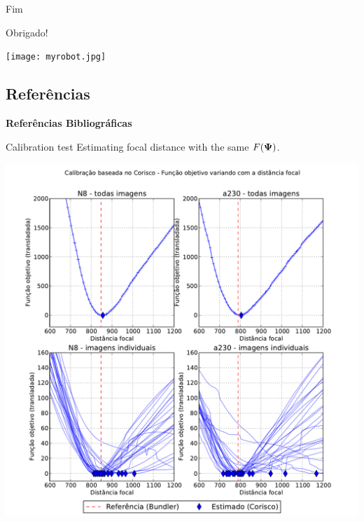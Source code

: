 \begin{frame}{Fim}
\begin{minipage}{10em}
  Obrigado!
\end{minipage}
\begin{minipage}{10em}
  \centerline{\texttt{[image: myrobot.jpg]}}
\end{minipage}

\end{frame}



\appendix
{}
\setcounter{finalframe}{\value{framenumber}}


\begin{frame}[allowframebreaks]
\section*{Referências}
\centerline{ \bf Referências Bibliográficas}
\vspace{-1\baselineskip}
\footnotesize
 
 
\end{frame}




\begin{frame}{Calibration test}
 Estimating focal distance with the same $F({\boldsymbol{\Psi}})$.
\centerline{
    \includegraphics[height=12\baselineskip]{edgel_cali.pdf}
  }
\end{frame}

















